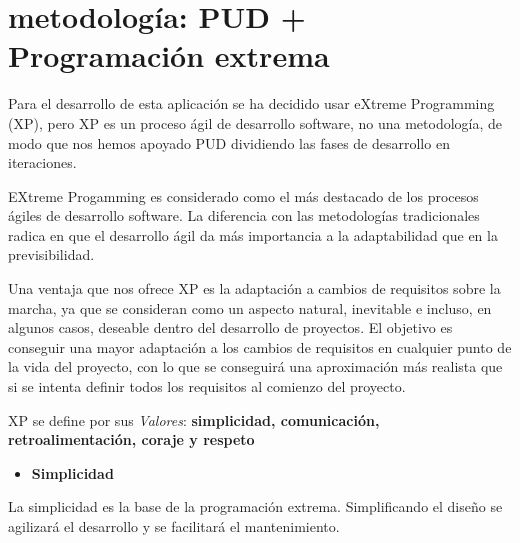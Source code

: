 \documentclass[12 pt, a4paper, twoside]{article}
\begin{document}










\section{metodología: PUD + Programación extrema}
Para el desarrollo de esta aplicación se ha decidido usar eXtreme
Programming (XP), pero XP es un proceso ágil de desarrollo
software, no una metodología, de modo que nos hemos apoyado PUD
dividiendo las fases de desarrollo en iteraciones.

EXtreme Progamming es considerado como el más destacado de los
procesos ágiles de desarrollo software. La diferencia con las
metodologías tradicionales radica en que el desarrollo ágil da más
importancia a la adaptabilidad que en la previsibilidad.

Una ventaja que nos ofrece XP es la adaptación a cambios de requisitos
sobre la marcha, ya que se consideran como un aspecto natural,
inevitable e incluso, en algunos casos, deseable dentro del desarrollo
de proyectos. El objetivo es conseguir una mayor adaptación a los
cambios de requisitos en cualquier punto de la vida del proyecto, con
lo que se conseguirá una aproximación más realista que si se intenta
definir todos los requisitos al comienzo del proyecto.

XP se define por sus \emph{Valores}: \textbf{simplicidad,
comunicación, retroalimentación, coraje y respeto}
\begin{itemize}
\item \textbf{Simplicidad}
\end{itemize}
La simplicidad es la base de la programación extrema. Simplificando el
diseño se agilizará el desarrollo y se facilitará el mantenimiento.
\end{document}

